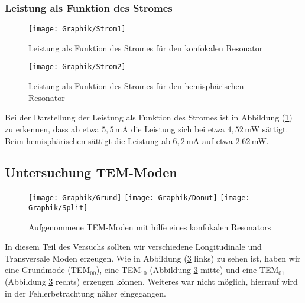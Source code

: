\documentclass[10pt,twoside]{article}
\renewcommand{\1}{^{-1}}
\renewcommand{\2}{^{-2}}
\newcommand{\3}{^{-3}}
\newcommand{\4}{^{-4}}
\newcommand{\5}{^{-5}}
\newcommand{\6}{^{-6}}
\newcommand{\7}{^{-7}}
\newcommand{\8}{^{-8}}
\newcommand{\9}{^{-9}}
\begin{document}
\subsubsection{Leistung als Funktion des Stromes}

\begin{figure}[H]
\centering
\texttt{[image: Graphik/Strom1]} 
\caption{Leistung als Funktion des Stromes für den konfokalen Resonator}
\label{fig:Strom1}
\end{figure}

\begin{figure}[H]
\centering
\texttt{[image: Graphik/Strom2]} 
\caption{Leistung als Funktion des Stromes für den hemisphärischen Resonator}
\label{fig:Strom2}
\end{figure}
Bei der Darstellung der Leistung als Funktion des Stromes ist in Abbildung (\ref{fig:Strom1}) zu erkennen, dass ab etwa $5,5$\,mA die Leistung sich bei etwa $4,52$\,mW  sättigt. Beim hemisphärischen sättigt die Leistung ab $6,2$\,mA auf etwa $2.62$\,mW.

\subsection{Untersuchung TEM-Moden}

\begin{figure}[!htb]
  \texttt{[image: Graphik/Grund]}
\label{fig:Grund}
\endminipage\hfill
{}
  \texttt{[image: Graphik/Donut]}
\label{fig:Donut}
\endminipage\hfill
{}
  \texttt{[image: Graphik/Split]}
\label{fig:Split}
\endminipage
\caption{Aufgenommene TEM-Moden mit hilfe eines konfokalen Resonators}
\label{bla}
\end{figure} \par

In diesem Teil des Versuchs sollten wir verschiedene Longitudinale und Transversale Moden erzeugen. Wie in Abbildung (\ref{bla} links) zu sehen ist, haben wir eine Grundmode (TEM$_{00}$), eine TEM$_{10}$ (Abbildung \ref{bla} mitte) und eine TEM$_{01}$ (Abbildung \ref{bla} rechts) erzeugen können. Weiteres war nicht möglich, hierrauf wird in der Fehlerbetrachtung näher eingegangen.
\end{document}
